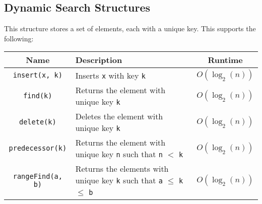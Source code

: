 \subsection{Dynamic Search Structures}

This structure stores a set of elements, each with a unique key.
This supports the following:
\begin{center}
  \begin{tabular}{ || c | p{7.5cm} | c || }
    \hline
    Name & Description & Runtime \\
    \hline
    \texttt{insert(x, k)} & Inserts \texttt{x}
    with key \texttt{k}
    & $O(\log_2(n))$ \\
    \hline
    \texttt{find(k)} & Returns the element with 
    unique key \texttt{k}
    & $O(\log_2(n))$ \\
    \hline
    \texttt{delete(k)} & Deletes the element with unique key
    \texttt{k}
    & $O(\log_2(n))$ \\
    \hline
    \texttt{predecessor(k)} & Returns the element with unique key
    \texttt{n} such that \texttt{n} $<$ \texttt{k}
    & $O(\log_2(n))$ \\
    \hline
    \texttt{rangeFind(a, b)} & Returns the elements with unique key
    \texttt{k} such that \texttt{a} $\leq$ \texttt{k} $\leq$ \texttt{b}
    & $O(\log_2(n))$ \\
    \hline
  \end{tabular}
\end{center}